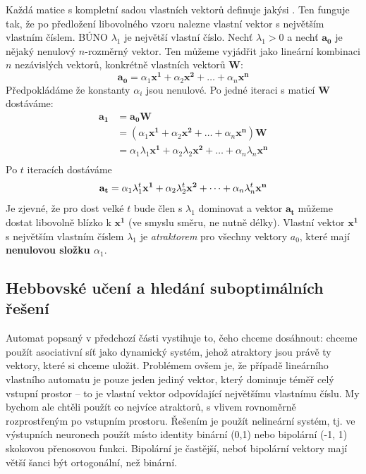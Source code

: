 \documentclass[11pt]{report} %
\renewcommand{\vec}[1]{\mathbf{#1}}
\numberwithin{equation}{section}
\begin{document}
Každá matice s kompletní sadou vlastních vektorů definuje jakýsi . Ten funguje tak, že po předložení libovolného vzoru nalezne vlastní vektor s největším vlastním číslem. BÚNO $\lambda_1$ je největší vlastní číslo. Nechť $\lambda_1 > 0$ a nechť $\vec{a_0}$ je nějaký nenulový $n$-rozměrný vektor. Ten můžeme vyjádřit jako lineární kombinaci $n$ nezávislých vektorů, konkrétně vlastních vektorů $\vec{W}$:
$$\vec{a_0} = \alpha_1\vec{x^1} + \alpha_2\vec{x^2} + \dots + \alpha_n\vec{x^n}$$ 
Předpokládáme že konstanty $\alpha_i$ jsou nenulové. Po jedné iteraci s maticí $\vec{W}$ dostáváme:
\begin{align*}
\vec{a_1} &= \vec{a_0}\vec{W} \\
&= (\alpha_1\vec{x^1} + \alpha_2\vec{x^2} + \dots + \alpha_n\vec{x^n})\vec{W} \\
&= \alpha_1\lambda_1\vec{x^1} + \alpha_2\lambda_2\vec{x^2} + \dots + \alpha_n\lambda_n\vec{x^n}\\
\end{align*}
Po $t$ iteracích dostáváme
$$\vec{a_t} = \alpha_1\lambda_1^t\vec{x^1} + \alpha_2\lambda_2^t\vec{x^2} + \dots + \alpha_n\lambda_n^t\vec{x^n}\\$$
Je zjevné, že pro dost velké $t$ bude člen s $\lambda_1$ dominovat a vektor $\vec{a_t}$ můžeme dostat libovolně blízko k $\vec{x^1}$ (ve smyslu směru, ne nutně délky). Vlastní vektor $\vec{x^1}$ s největším vlastním číslem $\lambda_1$ je \textit{atraktorem} pro všechny vektory $a_0$, které mají \textbf{nenulovou složku $\alpha_1$}.

\subsection{Hebbovské učení a hledání suboptimálních řešení}
Automat popsaný v předchozí části vystihuje to, čeho chceme dosáhnout: chceme použít asociativní síť jako dynamický systém, jehož atraktory jsou právě ty vektory, které si chceme uložit. Problémem ovšem je, že případě lineárního vlastního automatu je pouze jeden jediný vektor, který dominuje téměř celý vstupní prostor -- to je vlastní vektor odpovídající největšímu vlastnímu číslu. My bychom ale chtěli použít co nejvíce atraktorů, s vlivem rovnoměrně rozprostřeným po vstupním prostoru. Řešením je použít nelineární systém, tj. ve výstupních neuronech použít místo identity binární (0,1) nebo bipolární (-1, 1) skokovou přenosovou funkci. Bipolární je častější, neboť bipolární vektory mají větší šanci být ortogonální, než binární. 
\end{document}
